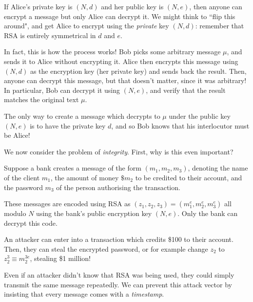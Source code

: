 \documentclass{article}
\begin{document}
If Alice's private key is $(N, d)$ and her public key is $(N, e)$, then anyone can encrypt a message but only Alice can decrypt it. We might think to ``flip this around", and get Alice to encrypt using the \textit{private} key $(N, d)$: remember that RSA is entirely symmetrical in $d$ and $e$.

In fact, this is how the process works! Bob picks some arbitrary message $\mu$, and sends it to Alice without encrypting it. Alice then encrypts this message using $(N, d)$ as the encryption key (her private key) and sends back the result. Then, anyone can decrypt this message, but that doesn't matter, since it was arbitrary! In particular, Bob can decrypt it using $(N, e)$, and verify that the result matches the original text $\mu$.

The only way to create a message which decrypts to $\mu$ under the public key $(N, e)$ is to have the private key $d$, and so Bob knows that his interlocutor must be Alice!

We now consider the problem of \textit{integrity}. First, why is this even important?

\begin{remark}
	\label{remark-homomorphism-attack}
    Suppose a bank creates a message of the form $(m_1, m_2, m_3)$, denoting the name of the client $m_1$, the amount of money $\$m_2$ to be credited to their account, and the password $m_3$ of the person authorising the transaction.
    
    These messages are encoded using RSA as $(z_1, z_2, z_3) = (m_1^e, m_2^e, m_3^e)$ all modulo $N$ using the bank's public encryption key $(N, e)$. Only the bank can decrypt this code.
    
    An attacker can enter into a transaction which credits \$100 to their account. Then, they can steal the encrypted password, or for example change $z_2$ to $z_2^3 \equiv m_2^{3e}$, stealing \$1 million!
\end{remark}

\begin{note}
	Even if an attacker didn't know that RSA was being used, they could simply transmit the same message repeatedly. We can prevent this attack vector by insisting that every message comes with a \textit{timestamp}.
\end{note}
\end{document}
